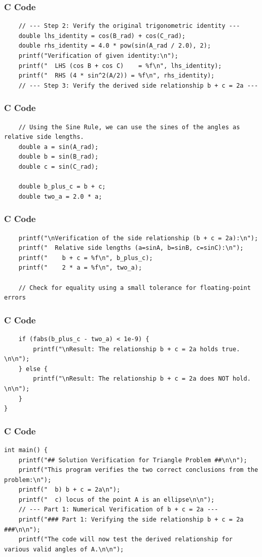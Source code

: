 \documentclass{beamer}
\begin{document}
\begin{frame}[fragile]
\frametitle{C Code}
\begin{lstlisting}
    // --- Step 2: Verify the original trigonometric identity ---
    double lhs_identity = cos(B_rad) + cos(C_rad);
    double rhs_identity = 4.0 * pow(sin(A_rad / 2.0), 2);
    printf("Verification of given identity:\n");
    printf("  LHS (cos B + cos C)    = %f\n", lhs_identity);
    printf("  RHS (4 * sin^2(A/2)) = %f\n", rhs_identity);
    // --- Step 3: Verify the derived side relationship b + c = 2a ---
\end{lstlisting}
\end{frame}

\begin{frame}[fragile]
\frametitle{C Code}
\begin{lstlisting}
    // Using the Sine Rule, we can use the sines of the angles as relative side lengths.
    double a = sin(A_rad);
    double b = sin(B_rad);
    double c = sin(C_rad);

    double b_plus_c = b + c;
    double two_a = 2.0 * a;
\end{lstlisting}
\end{frame}

\begin{frame}[fragile]
\frametitle{C Code}
\begin{lstlisting}
    printf("\nVerification of the side relationship (b + c = 2a):\n");
    printf("  Relative side lengths (a=sinA, b=sinB, c=sinC):\n");
    printf("    b + c = %f\n", b_plus_c);
    printf("    2 * a = %f\n", two_a);

    // Check for equality using a small tolerance for floating-point errors
\end{lstlisting}
\end{frame}

\begin{frame}[fragile]
\frametitle{C Code}
\begin{lstlisting}
    if (fabs(b_plus_c - two_a) < 1e-9) {
        printf("\nResult: The relationship b + c = 2a holds true. \n\n");
    } else {
        printf("\nResult: The relationship b + c = 2a does NOT hold. \n\n");
    }
}
\end{lstlisting}
\end{frame}

\begin{frame}[fragile]
\frametitle{C Code}
\begin{lstlisting}
int main() {
    printf("## Solution Verification for Triangle Problem ##\n\n");
    printf("This program verifies the two correct conclusions from the problem:\n");
    printf("  b) b + c = 2a\n");
    printf("  c) locus of the point A is an ellipse\n\n");
    // --- Part 1: Numerical Verification of b + c = 2a ---
    printf("### Part 1: Verifying the side relationship b + c = 2a ###\n\n");
    printf("The code will now test the derived relationship for various valid angles of A.\n\n");
\end{lstlisting}
\end{frame}
\end{document}
